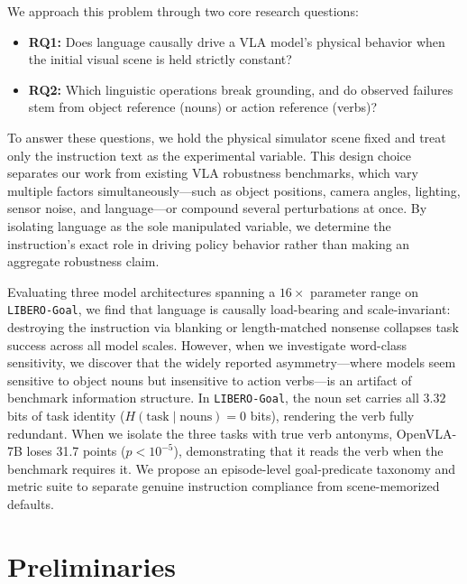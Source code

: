 \documentclass[11pt]{article}
\begin{document}
We approach this problem through two core research questions:
\begin{itemize}
    \item \textbf{RQ1:} Does language causally drive a VLA model's physical behavior when the initial visual scene is held strictly constant?
    \item \textbf{RQ2:} Which linguistic operations break grounding, and do observed failures stem from object reference (nouns) or action reference (verbs)?
\end{itemize}

To answer these questions, we hold the physical simulator scene fixed and treat only the instruction text as the experimental variable. This design choice separates our work from existing VLA robustness benchmarks, which vary multiple factors simultaneously---such as object positions, camera angles, lighting, sensor noise, and language---or compound several perturbations at once. By isolating language as the sole manipulated variable, we determine the instruction's exact role in driving policy behavior rather than making an aggregate robustness claim.

Evaluating three model architectures spanning a $16\times$ parameter range on \texttt{LIBERO-Goal}, we find that language is causally load-bearing and scale-invariant: destroying the instruction via blanking or length-matched nonsense collapses task success across all model scales. However, when we investigate word-class sensitivity, we discover that the widely reported asymmetry---where models seem sensitive to object nouns but insensitive to action verbs---is an artifact of benchmark information structure. In \texttt{LIBERO-Goal}, the noun set carries all $3.32$ bits of task identity ($H(\text{task}\mid\text{nouns})=0$ bits), rendering the verb fully redundant. When we isolate the three tasks with true verb antonyms, OpenVLA-7B loses 31.7 points ($p < 10^{-5}$), demonstrating that it reads the verb when the benchmark requires it. We propose an episode-level goal-predicate taxonomy and metric suite to separate genuine instruction compliance from scene-memorized defaults.

\section{Preliminaries}
\end{document}
